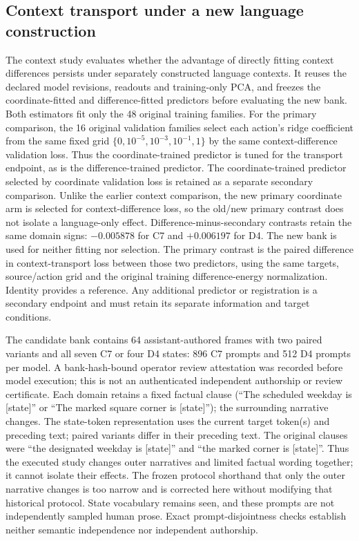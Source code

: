 \subsection{Context transport under a new language construction}
The context study evaluates whether the advantage of directly fitting context differences persists under separately constructed language contexts. It reuses the declared model revisions, readouts and training-only PCA, and freezes the coordinate-fitted and difference-fitted predictors before evaluating the new bank. Both estimators fit only the 48 original training families. For the primary comparison, the 16 original validation families select each action's ridge coefficient from the same fixed grid $\{0,10^{-5},10^{-3},10^{-1},1\}$ by the same context-difference validation loss. Thus the coordinate-trained predictor is tuned for the transport endpoint, as is the difference-trained predictor. The coordinate-trained predictor selected by coordinate validation loss is retained as a separate secondary comparison. Unlike the earlier context comparison, the new primary coordinate arm is selected for context-difference loss, so the old/new primary contrast does not isolate a language-only effect. Difference-minus-secondary contrasts retain the same domain signs: $-0.005878$ for C7 and $+0.006197$ for D4. The new bank is used for neither fitting nor selection. The primary contrast is the paired difference in context-transport loss between those two predictors, using the same targets, source/action grid and the original training difference-energy normalization. Identity provides a reference. Any additional predictor or registration is a secondary endpoint and must retain its separate information and target conditions.

The candidate bank contains 64 assistant-authored frames with two paired variants and all seven C7 or four D4 states: 896 C7 prompts and 512 D4 prompts per model. A bank-hash-bound operator review attestation was recorded before model execution; this is not an authenticated independent authorship or review certificate. Each domain retains a fixed factual clause (``The scheduled weekday is [state]'' or ``The marked square corner is [state]''); the surrounding narrative changes. The state-token representation uses the current target token(s) and preceding text; paired variants differ in their preceding text. The original clauses were ``the designated weekday is [state]'' and ``the marked corner is [state]''. Thus the executed study changes outer narratives and limited factual wording together; it cannot isolate their effects. The frozen protocol shorthand that only the outer narrative changes is too narrow and is corrected here without modifying that historical protocol. State vocabulary remains seen, and these prompts are not independently sampled human prose. Exact prompt-disjointness checks establish neither semantic independence nor independent authorship.

